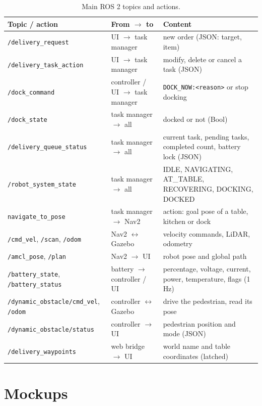 \documentclass[11pt,a4paper]{article}
\begin{document}
\begin{table}[H]
\centering
\small
\begin{tabularx}{\linewidth}{l l L}
\toprule
\textbf{Topic / action} & \textbf{From $\rightarrow$ to} & \textbf{Content} \\
\midrule
\texttt{/delivery\_request} & UI $\rightarrow$ task manager & new order (JSON: target, item) \\
\texttt{/delivery\_task\_action} & UI $\rightarrow$ task manager & modify, delete or cancel a task (JSON) \\
\texttt{/dock\_command} & controller / UI $\rightarrow$ task manager & \texttt{DOCK\_NOW:<reason>} or stop docking \\
\texttt{/dock\_state} & task manager $\rightarrow$ all & docked or not (Bool) \\
\texttt{/delivery\_queue\_status} & task manager $\rightarrow$ all & current task, pending tasks, completed count, battery lock (JSON) \\
\texttt{/robot\_system\_state} & task manager $\rightarrow$ all & IDLE, NAVIGATING, AT\_TABLE, RECOVERING, DOCKING, DOCKED \\
\texttt{navigate\_to\_pose} & task manager $\rightarrow$ Nav2 & action: goal pose of a table, kitchen or dock \\
\texttt{/cmd\_vel}, \texttt{/scan}, \texttt{/odom} & Nav2 $\leftrightarrow$ Gazebo & velocity commands, LiDAR, odometry \\
\texttt{/amcl\_pose}, \texttt{/plan} & Nav2 $\rightarrow$ UI & robot pose and global path \\
\texttt{/battery\_state}, \texttt{/battery\_status} & battery $\rightarrow$ controller / UI & percentage, voltage, current, power, temperature, flags (1\,Hz) \\
\texttt{/dynamic\_obstacle/cmd\_vel}, \texttt{/odom} & controller $\leftrightarrow$ Gazebo & drive the pedestrian, read its pose \\
\texttt{/dynamic\_obstacle/status} & controller $\rightarrow$ UI & pedestrian position and mode (JSON) \\
\texttt{/delivery\_waypoints} & web bridge $\rightarrow$ UI & world name and table coordinates (latched) \\
\bottomrule
\end{tabularx}
\caption{Main ROS 2 topics and actions.}
\end{table}

\section{Mockups}
\end{document}
